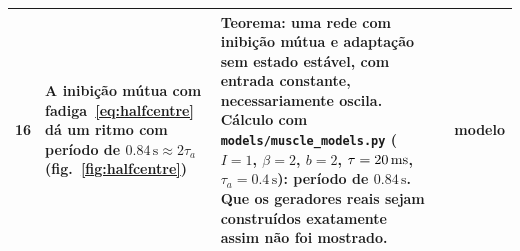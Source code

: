 {\begin{longtable}{>{\raggedright}p{0.5cm}>{\raggedright}p{4.0cm}>{\raggedright}p{5.6cm}>{\raggedright}p{2.3cm}>{\raggedright\arraybackslash}p{1.7cm}}
16 & A inibição mútua com fadiga~\eqref{eq:halfcentre} dá um ritmo com período de $0.84\,\text{s}\approx2\tau_a$ (fig.~\ref{fig:halfcentre}) & Teorema: uma rede com inibição mútua e adaptação sem estado estável, com entrada constante, necessariamente oscila. Cálculo com \texttt{models/\allowbreak muscle\_\allowbreak models.py} ($I=1$, $\beta=2$, $b=2$, $\tau=20\,\text{ms}$, $\tau_a=0.4\,\text{s}$): período de $0.84\,\text{s}$. Que os geradores reais sejam construídos exatamente assim não foi mostrado. & \cite{Matsuoka1985osc} & modelo \\
\bottomrule
\end{longtable}}
